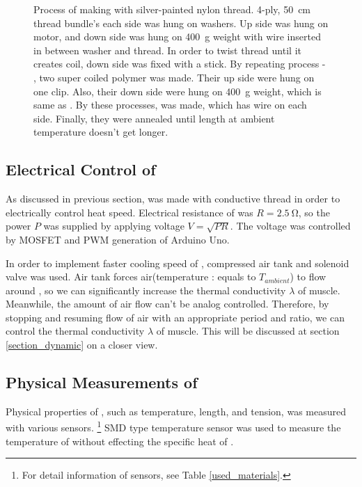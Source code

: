 \begin{figure}
	\caption[Process of making \scp with silver-painted nylon thread]{Process of making \scp with silver-painted nylon thread.  4-ply, \SI{50}{\centi\meter} thread bundle's each side was hung on washers.  Up side was hung on motor, and down side was hung on \SI{400}{\gram} weight with wire inserted in between washer and thread.  In order to twist thread until it creates coil, down side was fixed with a stick.  By repeating process  - , two super coiled polymer was made. Their up side were hung on one clip. Also, their down side were hung on \SI{400}{\gram} weight, which is same as .  By these processes, \scp was made, which has wire on each side.  Finally, they were annealed until length at ambient temperature doesn't get longer.}
	\label{silverSCP_makingof}
\end{figure}

\subsection{Electrical Control of \SCP}\label{section_electrical_control}
As discussed in previous section, \scp was made with conductive thread in order to electrically control heat speed. Electrical resistance of \scp was $R=\SI{2.5}{\ohm}$, so the power $P$ was supplied by applying voltage $V=\sqrt{PR}$. The voltage was controlled by MOSFET and PWM generation of Arduino Uno.

In order to implement faster cooling speed of \scp, compressed air tank and solenoid valve was used. Air tank forces air(temperature : equals to  $T_{ambient}$) to flow around \scp, so we can significantly increase the thermal conductivity $\lambda$ of muscle. Meanwhile, the amount of air flow can't be analog controlled. Therefore, by stopping and resuming flow of air with an appropriate period and ratio, we can control the thermal conductivity $\lambda$ of muscle. This will be discussed at section \ref{section_dynamic} on a closer view.

\subsection{Physical Measurements of \SCP}
Physical properties of \scp, such as temperature, length, and tension, was measured with various sensors.
\footnote{For detail information of sensors, see Table \ref{used_materials}.}
SMD type temperature sensor was used to measure the temperature of \scp without effecting the specific heat of \scpnospace.

